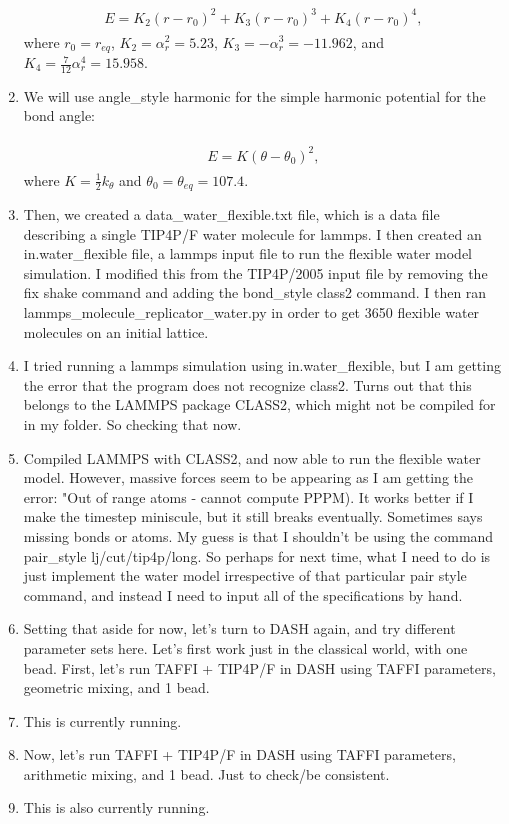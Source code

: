 \documentclass[12pt,reqno]{amsart}
\numberwithin{equation}{section}
\begin{document}
\begin{enumerate}
\begin{align}
\begin{split}
E = K_2(r - r_0)^2 + K_3(r - r_0)^3 + K_4(r - r_0)^4,
\end{split}
\end{align}
where $r_0 = r_{eq}$, $K_2 = \alpha_r^2 = 5.23$, $K_3 = -\alpha_r^3 = -11.962$, and $K_4 = \frac{7}{12}\alpha_r^4 = 15.958$.

\item We will use angle\_style harmonic for the simple harmonic potential for the bond angle:

\begin{align}
\begin{split}
E = K(\theta - \theta_0)^2,
\end{split}
\end{align}
where $K = \frac{1}{2}k_\theta$ and $\theta_0 = \theta_{eq} = 107.4$.  

\item Then, we created a data\_water\_flexible.txt file, which is a data file describing a single TIP4P/F water molecule for lammps.  I then created an in.water\_flexible file, a lammps input file to run the flexible water model simulation.  I modified this from the TIP4P/2005 input file by removing the fix shake command and adding the bond\_style class2 command.  I then ran lammps\_molecule\_replicator\_water.py in order to get 3650 flexible water molecules on an initial lattice.  
\item I tried running a lammps simulation using in.water\_flexible, but I am getting the error that the program does not recognize class2.  Turns out that this belongs to the LAMMPS package CLASS2, which might not be compiled for in my folder.  So checking that now.  

\item Compiled LAMMPS with CLASS2, and now able to run the flexible water model.  However, massive forces seem to be appearing as I am getting the error: "Out of range atoms - cannot compute PPPM).  It works better if I make the timestep miniscule, but it still breaks eventually.  Sometimes says missing bonds or atoms.  My guess is that I shouldn't be using the command pair\_style lj/cut/tip4p/long.  So perhaps for next time, what I need to do is just implement the water model irrespective of that particular pair style command, and instead I need to input all of the specifications by hand.  

\item Setting that aside for now, let's turn to DASH again, and try different parameter sets here.  Let's first work just in the classical world, with one bead.  First, let's run TAFFI + TIP4P/F in DASH using TAFFI parameters, geometric mixing, and 1 bead.   
\item This is currently running.
\item Now, let's run TAFFI + TIP4P/F in DASH using TAFFI parameters, arithmetic mixing, and 1 bead.  Just to check/be consistent.  
\item This is also currently running.  

 

\end{enumerate}
\end{document}
